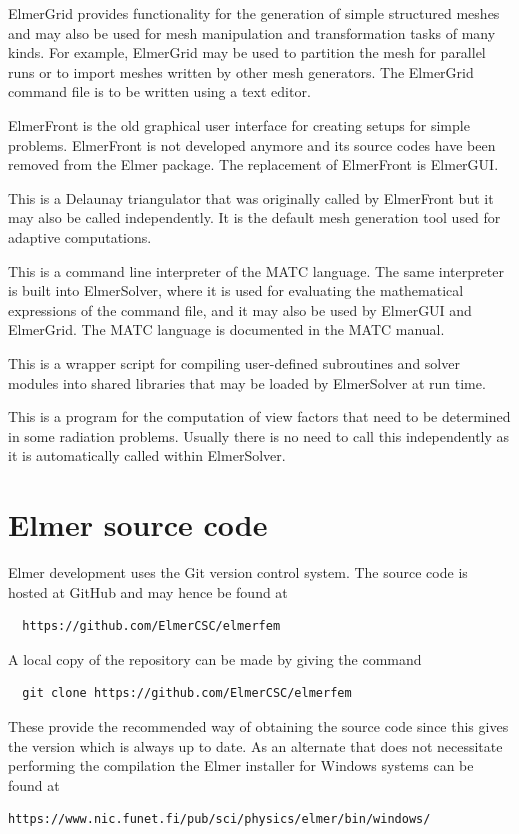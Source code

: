 ElmerGrid provides functionality for the generation of simple structured meshes and may also be used 
for mesh manipulation and transformation tasks of many kinds. For example, ElmerGrid may be used
to partition the mesh for parallel runs or to import meshes written by other mesh generators. 
The ElmerGrid command file is to be written using a text editor. 

ElmerFront is the old graphical user interface for creating setups for simple problems. 
ElmerFront is not developed anymore and its source codes have been removed from the Elmer package.
The replacement of ElmerFront is ElmerGUI. 

This is a Delaunay triangulator that was originally called by ElmerFront but it may also be called independently.
It is the default mesh generation tool used for adaptive computations.

This is a command line interpreter of the MATC language. The same interpreter is built into 
ElmerSolver, where it is used for evaluating the mathematical expressions of the command file, 
and it may also be used by ElmerGUI and ElmerGrid. The MATC language is documented in the 
MATC manual.

This is a wrapper script for compiling user-defined subroutines and solver modules into shared 
libraries that may be loaded by ElmerSolver at run time. 

This is a program for the computation of view factors that need to be determined in some radiation 
problems. Usually there is no need to call this independently as it is automatically called 
within ElmerSolver.
\sifend



\section{Elmer source code}

Elmer development uses the Git version control system. The source code is hosted at GitHub and may hence be found at
\begin{verbatim}
  https://github.com/ElmerCSC/elmerfem
\end{verbatim}
A local copy of the repository can be made by giving the command
\begin{verbatim}
  git clone https://github.com/ElmerCSC/elmerfem
\end{verbatim}
These provide the recommended way of obtaining the source code since this gives the version which is always up to date. 
As an alternate that does not necessitate performing the compilation
the Elmer installer for Windows systems can be found at
\begin{verbatim}
https://www.nic.funet.fi/pub/sci/physics/elmer/bin/windows/
\end{verbatim}

